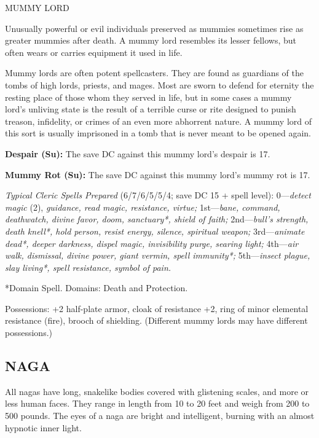 \documentclass{article}
\begin{document}
\vspace{12pt}
MUMMY LORD

Unusually powerful or evil individuals preserved as mummies sometimes rise as greater 
mummies after death. A mummy lord resembles its lesser fellows, but often wears 
or carries equipment it used in life.

Mummy lords are often potent spellcasters. They are found as guardians of the tombs 
of high lords, priests, and mages. Most are sworn to defend for eternity the resting 
place of those whom they served in life, but in some cases a mummy lord's unliving 
state is the result of a terrible curse or rite designed to punish treason, infidelity, 
or crimes of an even more abhorrent nature. A mummy lord of this sort is usually 
imprisoned in a tomb that is never meant to be opened again.

\textbf{Despair (Su):} The save DC against this mummy lord's despair is 17.

\textbf{Mummy Rot (Su): }The save DC against this mummy lord's mummy rot is 17.

\textit{Typical Cleric Spells Prepared }(6/7/6/5/5/4; save DC 15 + spell level): 
0---\textit{detect magic }(2), \textit{guidance, read magic, resistance, virtue; 
}1st---\textit{bane, command, deathwatch, divine favor, doom, sanctuary*, shield 
of faith; }2nd---\textit{bull's strength, death knell*, hold person, resist energy, 
silence, spiritual weapon; }3rd---\textit{animate dead*, deeper darkness, dispel 
magic, invisibility purge, searing light; }4th---\textit{air walk, dismissal, divine 
power, giant vermin, spell immunity*; }5th---\textit{insect plague, slay living*, 
spell resistance, symbol of pain.}

*Domain Spell. Domains: Death and Protection.

Possessions: +2 half-plate armor, cloak of resistance +2, ring of minor elemental 
resistance (fire), brooch of shielding. (Different mummy lords may have different 
possessions.)

\vspace{12pt}
\subsection*{{\LARGE{}NAGA}}

All nagas have long, snakelike bodies covered with glistening scales, and more 
or less human faces. They range in length from 10 to 20 feet and weigh from 200 
to 500 pounds. The eyes of a naga are bright and intelligent, burning with an almost 
hypnotic inner light.
\end{document}
